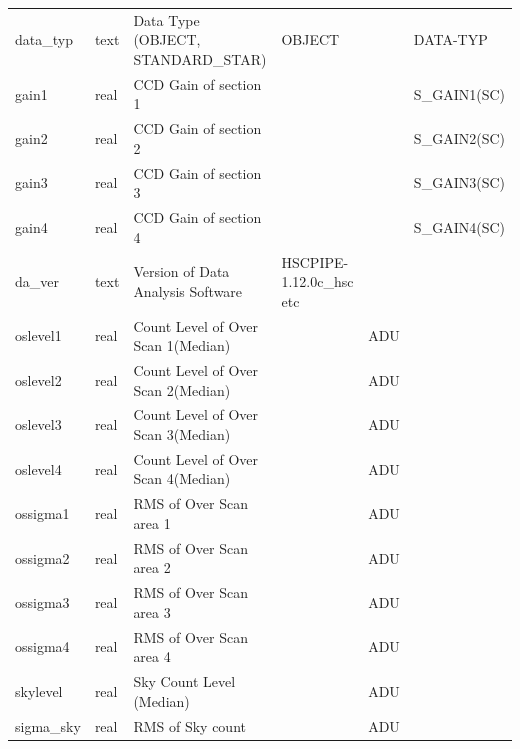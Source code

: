 \documentclass[12pt]{article}
\begin{document}
\begin{table}[thbp]
\begin{center}
{\begin{tabular}{llllll}
data\_typ & text & Data Type (OBJECT, STANDARD\_STAR)                   & OBJECT                     &             & DATA-TYP  \\
gain1 & real & CCD Gain of section 1                               &                            &             & S\_GAIN1(SC)  \\
gain2 & real & CCD Gain of section 2                               &                            &             & S\_GAIN2(SC)  \\
gain3 & real & CCD Gain of section 3                               &                            &             & S\_GAIN3(SC)  \\
gain4 & real & CCD Gain of section 4                               &                            &             & S\_GAIN4(SC)  \\
da\_ver & text & Version of Data Analysis Software                   & HSCPIPE-1.12.0c\_hsc etc    &             &   \\
oslevel1 & real & Count Level of Over Scan 1(Median)                  &                            & ADU         &   \\
oslevel2 & real & Count Level of Over Scan 2(Median)                  &                            & ADU         &   \\
oslevel3 & real & Count Level of Over Scan 3(Median)                  &                            & ADU         &   \\
oslevel4 & real & Count Level of Over Scan 4(Median)                  &                            & ADU         &   \\
ossigma1 & real & RMS of Over Scan area 1                             &                            & ADU         &   \\
ossigma2 & real & RMS of Over Scan area 2                             &                            & ADU         &   \\
ossigma3 & real & RMS of Over Scan area 3                             &                            & ADU         &   \\
ossigma4 & real & RMS of Over Scan area 4                             &                            & ADU         &   \\
skylevel & real & Sky Count Level (Median)                            &                            & ADU         &   \\
sigma\_sky & real & RMS of Sky count                                    &                            & ADU         &   \\

\end{tabular}}
\end{center}
\end{table}
\end{document}
